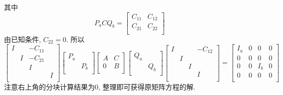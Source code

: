 \begin{itemize}
\begin{solution}
		其中
		\begin{equation*}
		P_a C Q_b = \begin{bmatrix}
			C_{11}&C_{12}\\
			C_{21}&C_{22}\\
		\end{bmatrix}
		\end{equation*}
		由已知条件, $C_{22}=0$. 所以
		\begin{equation*}
		\begin{bmatrix}
			I& &-C_{11}& \\
			&I &-C_{21}&\\
			& &I&\\
			& &&I\\
		\end{bmatrix}
		\begin{bmatrix}
			P_a&\\
			&P_b\\
		\end{bmatrix}
		\begin{bmatrix}
			A&C\\
			0&B\\
		\end{bmatrix}
		\begin{bmatrix}
			Q_a&\\
			&Q_b\\
		\end{bmatrix}
		\begin{bmatrix}
			I& & &-C_{12}\\
			&I & &\\
			& &I&\\
			& &&I\\
		\end{bmatrix}
		=
		\begin{bmatrix}
			I_a&0&0&0\\
			0&0&0&0\\
			0&0& I_b& 0\\
			0&0& 0& 0\\
		\end{bmatrix}
		\end{equation*}
		注意右上角的分块计算结果为0, 整理即可获得原矩阵方程的解.
	\end{solution}
	\vspace{5cm}
\end{itemize}

